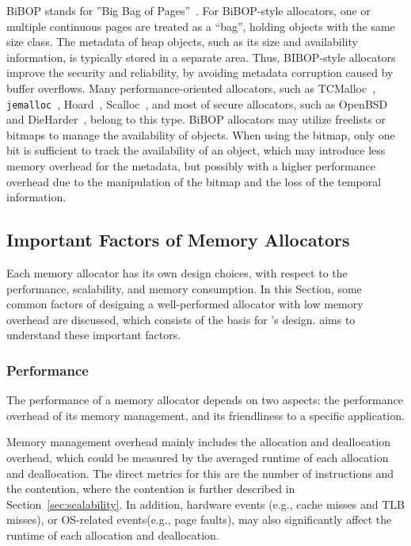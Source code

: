 BiBOP stands for ''Big Bag of Pages''~\citep{hanson1980}. For BiBOP-style allocators, one or multiple continuous pages are treated as a ``bag'', holding objects with the same size class. The metadata of heap objects, such as its size and availability information, is typically stored in a separate area. Thus, BIBOP-style allocators improve the security and reliability, by avoiding metadata corruption caused by buffer overflows. Many performance-oriented allocators, such as TCMalloc~\citep{TCMalloc}, \texttt{jemalloc}~\citep{jemalloc}, Hoard~\citep{Hoard}, Scalloc~\citep{Scalloc}, and most of secure allocators, such as OpenBSD~\citep{OpenBSD} and DieHarder~\citep{DieHarder}, belong to this type. BiBOP allocators may utilize freelists or bitmaps to manage the availability of objects. When using the bitmap, only one bit is sufficient to track the availability of an object, which may introduce less memory overhead for the metadata, but possibly with a higher performance overhead due to the manipulation of the bitmap and the loss of the temporal information.  


\subsection{Important Factors of Memory Allocators}

\label{sec:factors}

Each memory allocator has its own design choices, with respect to the performance, scalability, and memory consumption. In this Section, some common factors of designing a well-performed allocator with low memory overhead are discussed, which consists of the basis for \MP{}'s design. \MP{} aims to understand these important factors. 

\subsubsection{Performance}
\label{sec:performance}

The performance of a memory allocator depends on two aspects: the performance overhead of its memory management, and its friendliness to a specific application. 

Memory management overhead mainly includes the allocation and deallocation overhead, which could be measured by the averaged runtime of each allocation and deallocation. The  direct metrics for this are the number of instructions and the contention, where the contention is further described in Section~\ref{sec:scalability}. In addition, hardware events (e.g., cache misses and TLB misses), or OS-related events(e.g., page faults), may also significantly affect the runtime of each allocation and deallocation. %

